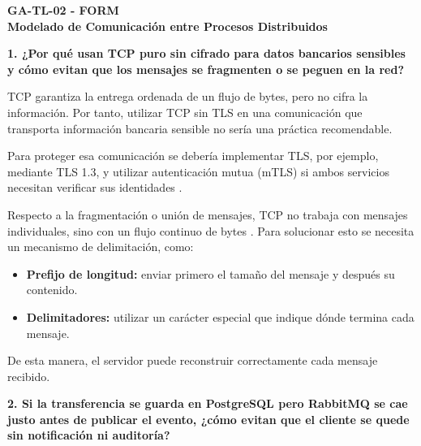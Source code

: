 \documentclass[12pt, a4paper]{article}
\begin{document}
\justifying %

\begin{center}
    \textbf{GA-TL-02 - FORM} \\
    \textbf{Modelado de Comunicación entre Procesos Distribuidos} \\
    \vspace{0.3cm}
\end{center}

\vspace{0.5cm}

\textbf{1. ¿Por qué usan TCP puro sin cifrado para datos bancarios sensibles y cómo evitan que los mensajes se fragmenten o se peguen en la red?}

TCP garantiza la entrega ordenada de un flujo de bytes, pero no cifra la información. Por tanto, utilizar TCP sin TLS en una comunicación que transporta información bancaria sensible no sería una práctica recomendable.

Para proteger esa comunicación se debería implementar TLS, por ejemplo, mediante TLS 1.3, y utilizar autenticación mutua (mTLS) si ambos servicios necesitan verificar sus identidades \cite{vansteen2023}.

Respecto a la fragmentación o unión de mensajes, TCP no trabaja con mensajes individuales, sino con un flujo continuo de bytes \cite{vansteen2023}. Para solucionar esto se necesita un mecanismo de delimitación, como:

\begin{itemize}[leftmargin=1.5cm]
    \item \textbf{Prefijo de longitud:} enviar primero el tamaño del mensaje y después su contenido.
    \item \textbf{Delimitadores:} utilizar un carácter especial que indique dónde termina cada mensaje.
\end{itemize}

De esta manera, el servidor puede reconstruir correctamente cada mensaje recibido.

\vspace{0.4cm}

\textbf{2. Si la transferencia se guarda en PostgreSQL pero RabbitMQ se cae justo antes de publicar el evento, ¿cómo evitan que el cliente se quede sin notificación ni auditoría?}
\end{document}
